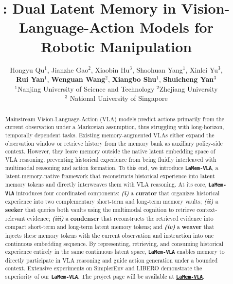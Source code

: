 \documentclass{article} %
\title{\ourmethod: Dual Latent Memory  in Vision-Language-Action Models for Robotic Manipulation}
\author{Hongyu Qu$^{1}$, Jianzhe Gao$^{2}$, Xiaobin Hu$^{3}$, Shaohuan Yang$^{1}$, Xinlei Yu$^{3}$, \\ \textbf{Rui Yan$^{1}$}, \textbf{Wenguan Wang$^{2}$}, \textbf{Xiangbo Shu$^{1}$}, \textbf{Shuicheng Yan$^{3}$}\\
  {\small $^1$Nanjing University of Science and Technology \quad $^2$Zhejiang University}\\ 
  {\small $^3$ National University of Singapore} \vspace{.5em} \\
}
\DeclareRobustCommand{\ourmethod}{\texttt{\textbf{LaMem-VLA}}\xspace}
\theoremstyle{plain}
\theoremstyle{definition}
\begin{document}
\maketitle
\begin{abstract}
Mainstream Vision-Language-Action (VLA) models predict actions primarily from the current observation under a Markovian assumption, thus struggling with long-horizon, temporally dependent tasks. 
Existing memory-augmented VLAs either expand the observation window or retrieve history from the memory bank as auxiliary policy-side context.
However, they leave memory outside the native latent embedding space of VLA reasoning, preventing historical experience from being fluidly interleaved with multimodal reasoning and action formation.
To this end, we introduce \ourmethod, a latent-memory-native framework that reconstructs historical experience into latent memory tokens and directly interweaves them with VLA reasoning. 
At its core, \ourmethod introduces four coordinated components: 
\textit{\textbf{(i)}} a \textbf{curator} that organizes historical experience into two complementary short-term and long-term memory vaults; \textit{\textbf{(ii)}} a \textbf{seeker} that queries both vaults using the multimodal cognition to retrieve context-relevant evidence; \textit{\textbf{(iii)}} a \textbf{condenser} that reconstructs the retrieved evidence into compact short-term and long-term latent memory tokens; and \textit{\textbf{(iv)}} a \textbf{weaver} that injects these memory tokens with the current observation and instruction into one continuous embedding sequence.
By representing, retrieving, and consuming historical experience entirely in the same continuous latent space, \ourmethod enables memory to directly participate in VLA reasoning and guide action generation under a bounded context.
Extensive experiments on SimplerEnv and LIBERO demonstrate the superiority of our \ourmethod. 
The project page will be available at \href{https://github.com/quhongyu/LaMem-VLA}{\ourmethod}.


\end{abstract}










% 
\end{document}
